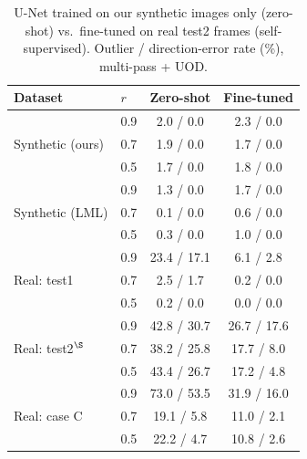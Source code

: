 \begin{table}[t]
\centering
\caption{U-Net trained on our synthetic images only (zero-shot) vs.\ fine-tuned on real test2 frames (self-supervised). Outlier / direction-error rate (\%), multi-pass + UOD.}
\label{tab:model}
\small
\begin{tabular}{llcc}
\toprule
Dataset & $r$ & Zero-shot & Fine-tuned \\
\midrule
\multirow{3}{*}{Synthetic (ours)} & 0.9 & 2.0 / 0.0 & 2.3 / 0.0 \\
 & 0.7 & 1.9 / 0.0 & 1.7 / 0.0 \\
 & 0.5 & 1.7 / 0.0 & 1.8 / 0.0 \\
\midrule
\multirow{3}{*}{Synthetic (LML)} & 0.9 & 1.3 / 0.0 & 1.7 / 0.0 \\
 & 0.7 & 0.1 / 0.0 & 0.6 / 0.0 \\
 & 0.5 & 0.3 / 0.0 & 1.0 / 0.0 \\
\midrule
\multirow{3}{*}{Real: test1} & 0.9 & 23.4 / 17.1 & 6.1 / 2.8 \\
 & 0.7 & 2.5 / 1.7 & 0.2 / 0.0 \\
 & 0.5 & 0.2 / 0.0 & 0.0 / 0.0 \\
\midrule
\multirow{3}{*}{Real: test2$^\S$} & 0.9 & 42.8 / 30.7 & 26.7 / 17.6 \\
 & 0.7 & 38.2 / 25.8 & 17.7 / 8.0 \\
 & 0.5 & 43.4 / 26.7 & 17.2 / 4.8 \\
\midrule
\multirow{3}{*}{Real: case C} & 0.9 & 73.0 / 53.5 & 31.9 / 16.0 \\
 & 0.7 & 19.1 / 5.8 & 11.0 / 2.1 \\
 & 0.5 & 22.2 / 4.7 & 10.8 / 2.6 \\
\bottomrule
\end{tabular}
\end{table}
